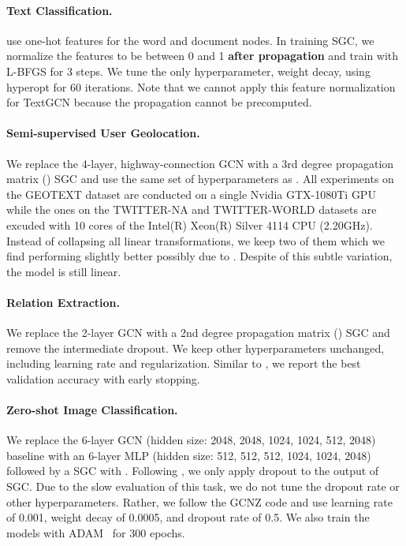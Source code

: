 \documentclass{article}
\begin{document}
\paragraph{Text Classification.} 
\citet{textGCN} use one-hot features for the word and document nodes. In training SGC, we normalize the features to be between 0 and 1 \textbf{after propagation} and train with L-BFGS for 3 steps. We tune the only hyperparameter, weight decay, using hyperopt\cite{hyperopt} for 60 iterations. Note that we cannot apply this feature normalization for TextGCN because the propagation cannot be precomputed. 
\paragraph{Semi-supervised User Geolocation.}
We replace the 4-layer, highway-connection GCN with a 3rd degree propagation matrix () SGC and use the same set of hyperparameters as \citet{Rahimi18}. All experiments on the GEOTEXT dataset are conducted on a single Nvidia GTX-1080Ti GPU while the ones on the TWITTER-NA and TWITTER-WORLD datasets are excuded with 10 cores of the Intel(R) Xeon(R) Silver 4114 CPU (2.20GHz). Instead of collapsing all linear transformations, we keep two of them which we find performing slightly better possibly due to . Despite of this subtle variation, the model is still linear.
\paragraph{Relation Extraction.}
We replace the 2-layer GCN with a 2nd degree propagation matrix () SGC and remove the intermediate dropout. We keep other hyperparameters unchanged, including learning rate and regularization. Similar to \citet{relation-extraction}, we report the best validation accuracy with early stopping.
\paragraph{Zero-shot Image Classification.}
We replace the 6-layer GCN (hidden size: 2048, 2048, 1024, 1024, 512, 2048) baseline with an 6-layer MLP (hidden size: 512, 512, 512, 1024, 1024, 2048) followed by a SGC with . Following \cite{wang2018zero}, we only apply dropout to the output of SGC. Due to the slow evaluation of this task, we do not tune the dropout rate or other hyperparameters. Rather, we follow the GCNZ code and use learning rate of 0.001, weight decay of 0.0005, and dropout rate of 0.5. We also train the models with ADAM~\cite{adam} for 300 epochs.
\end{document}
